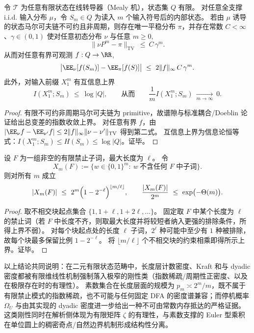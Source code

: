 \begin{proposition}[常数内存机制的指数遗忘与每比特互信息塌缩]\label{prop:zeta-syntax-constant-memory-exponential-forgetting}
令 \(\mathcal T\) 为任意有限状态在线转导器（Mealy 机），状态集 \(Q\) 有限。
对任意全支撑 i.i.d. 输入分布 \(\mu\)，令 \(S_m\in Q\) 为读入 \(m\) 个输入符号后的内部状态。
若由 \(\mu\) 诱导的状态马尔可夫链不可约且非周期，则存在唯一平稳分布 \(\pi\)，并存在常数 \(C<\infty\)、\(\gamma\in(0,1)\) 使对任意初态分布 \(\nu\) 与任意 \(m\ge 0\),
\[
\|\nu P^m-\pi\|_{\mathrm{TV}}\ \le\ C\,\gamma^m.
\]
从而对任意有界可观测 \(f:Q\to\RR\),
\[
\bigl|\EE_\nu[f(S_m)]-\EE_\pi[f(S)]\bigr|
\ \le\ 2\|f\|_\infty\,C\,\gamma^m.
\]
此外，对输入前缀 \(X_1^m\) 有互信息上界
\[
I(X_1^m;S_m)\ \le\ \log |Q|,
\qquad\text{从而}\qquad
\frac{1}{m}I(X_1^m;S_m)\ \xrightarrow[m\to\infty]{}\ 0.
\]
\end{proposition}
\begin{proof}
有限不可约非周期马尔可夫链为 primitive，故谱隙与标准耦合/Doeblin 论证给出总变差的指数收敛上界。
对任意有界 \(f\)，由 \(|\EE_\nu f-\EE_{\nu'}f|\le 2\|f\|_\infty\|\nu-\nu'\|_{\mathrm{TV}}\) 得到第二式。
互信息上界为信息论恒等式：\(I(X_1^m;S_m)\le H(S_m)\le \log|Q|\)。证毕。
\end{proof}

\begin{proposition}[有限禁止模式的显式指数稀疏上界]\label{prop:zeta-syntax-finite-forbidden-exp-sparse}
设 \(F\) 为一组非空的有限禁止子词，最大长度为 \(\ell\)。
令
\[
X_m(F):=\{w\in\{0,1\}^m:\ w\ \text{不含任何 }F\text{ 中子词}\}.
\]
则对所有 \(m\) 成立
\[
|X_m(F)|\ \le\ 2^m\Bigl(1-2^{-\ell}\Bigr)^{\lfloor m/\ell\rfloor},
\qquad
\frac{|X_m(F)|}{2^m}\ \le\ \exp\bigl(-\Theta(m)\bigr).
\]
\end{proposition}
\begin{proof}
取不相交块起点集合 \(\{1,1+\ell,1+2\ell,\dots\}\)。
固定取 \(F\) 中某个长度为 \(\ell\) 的禁止词（若 \(F\) 中长度不齐，则取最大长度并将较短者纳入更强的排除条件，所得上界不弱）。
对每个块起点处的长度 \(\ell\) 子词，\(2^\ell\) 种可能中至少有 \(1\) 种被排除，故每个块最多保留比例 \(1-2^{-\ell}\)。
将 \(\lfloor m/\ell\rfloor\) 个不相交块的约束相乘即得所示上界。证毕。
\end{proof}

\par
以上结论共同说明：在二元有限状态范畴中，长度层计数密度、Kraft 和与 dyadic 密度都被有限维线性机制强制落入极窄的刚性类（指数稀疏/周期性正密度、以及在极限存在时的有理性）。
素数集合在长度层面的规模为 \(p_m\asymp 2^m/m\)，既不属于有限禁止模式的指数稀疏，也不可能与任何固定 DFA 的密度谱兼容；而停机概率 \(\Omega_U\) 与由其实现的 dyadic 密度进一步给出一种不可由常数内存抵达的严格证据。
这类刚性同时在解析侧体现为有限矩阵 \(\zeta\) 的有理性，与素数支撑的 Euler 型乘积在单位圆上的稠密奇点/自然边界机制形成结构性分离。

